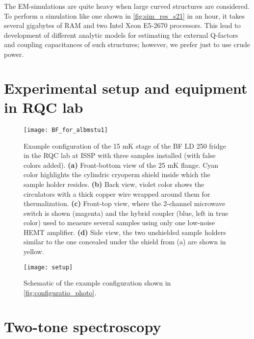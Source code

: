 \documentclass[12pt, twoside]{report}
\numberwithin{equation}{section}
\begin{document}
The EM-simulations are quite heavy when large curved structures are considered. To perform a simulation like one shown in \autoref{fig:sim_res_s21} in an hour, it takes several gigabytes of RAM and two Intel Xeon E5-2670 processors. This lead to development of different analytic models for estimating the external Q-factors and coupling capacitances of such structures; however, we prefer just to use crude power.

\section{Experimental setup and equipment in RQC lab}
 

\begin{figure}[h!]
\centering
\texttt{[image: BF\_for\_albmstu1]}
\caption{Example configuration of the 15 mK stage of the BF LD 250 fridge in the RQC lab at ISSP with three samples installed (with false colors added). \textbf{(a)} Front-bottom view of the 25 mK flange. Cyan color highlights the cylindric cryoperm shield inside which the sample holder resides. \textbf{(b)} Back view, violet color shows the circulators with a thick copper wire wrapped around them for thermalization. \textbf{(c)} Front-top view, where the 2-channel  microwave switch is shown (magenta) and the hybrid coupler (blue, left in true color) used to measure several samples using only one low-noise HEMT amplifier. \textbf{(d)} Side view, the two unshielded sample holders similar to the one concealed under the shield from (a) are shown in yellow.}
\label{fig:configuratio_photo}
\end{figure}

\begin{figure}[h!]
\centering
\texttt{[image: setup]}
\caption{Schematic of the example configuration shown in \autoref{fig:configuratio_photo}.}
\end{figure}

\section{Two-tone spectroscopy}
\label{sec:2tone}
\end{document}
